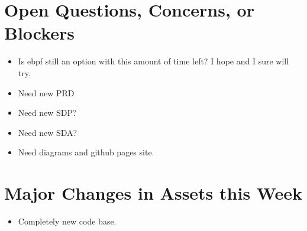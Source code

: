 \documentclass{article}
\begin{document}
\section*{Open Questions, Concerns, or Blockers}
\begin{itemize}[label={--}]
    \item Is ebpf still an option with this amount of time left? I hope and I sure will try.
    \item Need new PRD
    \item Need new SDP?
    \item Need new SDA?
    \item Need diagrams and github pages site.
\end{itemize}

\section*{Major Changes in Assets this Week}
\begin{itemize}[label={--}]
    \item Completely new code base. 
\end{itemize}

\end{document}
